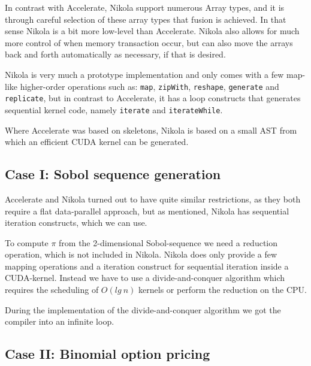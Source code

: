 \documentclass[preprint]{sigplanconf}
\begin{document}
In contrast with Accelerate, Nikola support numerous Array types, and
it is through careful selection of these array types that fusion is
achieved. In that sense Nikola is a bit more low-level than
Accelerate. Nikola also allows for much more control of when memory
transaction occur, but can also move the arrays back and forth
automatically as necessary, if that is desired.

Nikola is very much a prototype implementation and only comes with a
few map-like higher-order operations such as: \verb|map|,
\verb|zipWith|, \verb|reshape|, \verb|generate| and \verb|replicate|,
but in contrast to Accelerate, it has a loop constructs that generates
sequential kernel code, namely \verb|iterate| and \verb|iterateWhile|.

Where Accelerate was based on skeletons, Nikola is based on a small
AST from which an efficient CUDA kernel can be generated.

\subsection{Case I: Sobol sequence generation}
Accelerate and Nikola turned out to have quite similar restrictions,
as they both require a flat data-parallel approach, but as mentioned,
Nikola has sequential iteration constructs, which we can use. 

To compute $\pi$ from the 2-dimensional Sobol-sequence we need
a reduction operation, which is not included in Nikola. Nikola does
only provide a few mapping operations and a iteration construct for
sequential iteration inside a CUDA-kernel. Instead we have to use a
divide-and-conquer algorithm which requires the scheduling of
$O(lg~n)$ kernels or perform the reduction on the CPU.

During the implementation of the divide-and-conquer algorithm we got
the compiler into an infinite loop. 

\subsection{Case II: Binomial option pricing}

\end{document}
